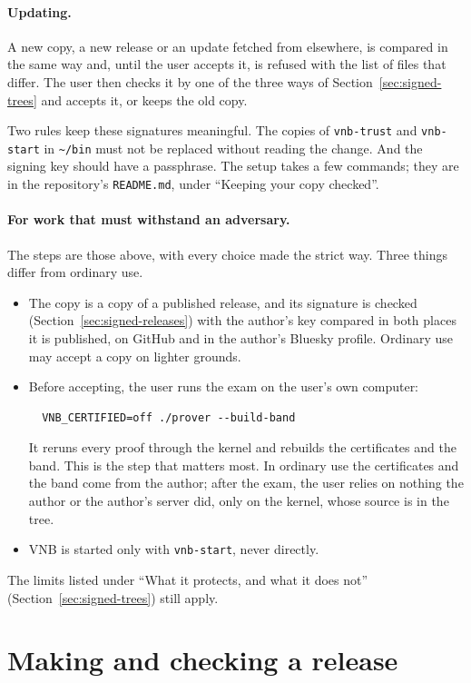 \paragraph{Updating.}  A new copy, a new release or an update fetched
from elsewhere, is compared in the same way and, until the user
accepts it, is refused with the list of files that differ.  The user
then checks it by one of the three ways of Section~\ref{sec:signed-trees}
and accepts it, or keeps
the old copy.

Two rules keep these signatures meaningful.  The copies of \texttt{vnb-trust} and
\texttt{vnb-start} in \texttt{\textasciitilde/bin} must not be replaced
without reading the change.  And the signing key should have a
passphrase.  The setup takes a few commands; they are in the
repository's \texttt{README.md}, under ``Keeping your copy checked''.

\paragraph{For work that must withstand an adversary.}  The steps are
those above, with every choice made the strict way.  Three things
differ from ordinary use.
\begin{itemize}
\item The copy is a copy of a published release, and its signature is
  checked (Section~\ref{sec:signed-releases}) with the author's key
  compared in both places it is published, on GitHub and in the
  author's Bluesky profile.  Ordinary use may
  accept a copy on lighter grounds.
\item Before accepting, the user runs the exam on the user's own
  computer:
\begin{verbatim}
  VNB_CERTIFIED=off ./prover --build-band
\end{verbatim}
  It reruns every proof through the kernel and rebuilds the
  certificates and the band.  This is the step that matters most.  In
  ordinary use the certificates and the band come from the author;
  after the exam, the user relies on nothing the author or the
  author's server did, only on the kernel, whose source is in the
  tree.
\item VNB is started only with \texttt{vnb-start}, never directly.
\end{itemize}
The limits listed under ``What it protects, and what it does not''
(Section~\ref{sec:signed-trees}) still apply.


\section{Making and checking a release}
\label{sec:signed-releases-use}

